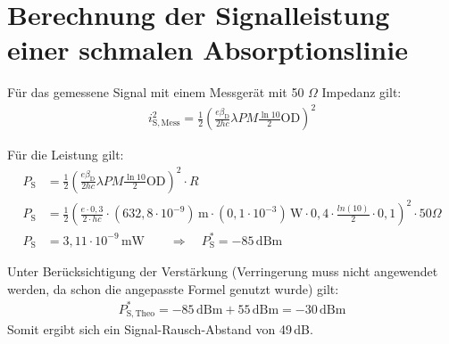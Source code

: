 
\section{Berechnung der Signalleistung einer schmalen Absorptionslinie}
\label{sec:signalAbsorp}

Für das gemessene Signal mit einem Messgerät mit 50 $\Omega$ Impedanz gilt:
\begin{gather}
    i_\mathrm{S,Mess}^2 = \frac{1}{2}\left(\frac{e\beta_\mathrm{D}}{2hc}\lambda P M \frac{\ln10}{2}\mathrm{OD}\right)^2
\end{gather}

Für die Leistung gilt:
\begin{align}
    \label{eq:leistungPhotosignal}
    P_\mathrm{S} &= \frac{1}{2}\left(\frac{e\beta_\mathrm{D}}{2hc}\lambda P M \frac{\ln10}{2}\mathrm{OD}\right)^2 \cdot R\\
    P_\mathrm{S} &= \frac{1}{2} \left( \frac{e\cdot 0,3}{2\cdot h c} \cdot (632,8 \cdot 10^{-9}) \, \mathrm{m} \cdot (0,1 \cdot 10^{-3}) \, \mathrm{W} \cdot 0,4 \cdot \frac{ln(10)}{2} \cdot 0,1\right)^2 \cdot 50 \Omega \\
    P_\mathrm{S} &= 3,11 \cdot 10^{-9}\,\mathrm{mW} \qquad \Rightarrow \quad P_\mathrm{S}^* = -85 \, \mathrm{dBm}
\end{align}

Unter Berücksichtigung der Verstärkung (Verringerung muss nicht angewendet werden, da schon die angepasste Formel genutzt wurde) gilt:
\begin{gather}
    P_\mathrm{S,Theo}^* = -85 \, \text{dBm} + 55 \, \text{dBm} = -30 \, \text{dBm}
\end{gather}
Somit ergibt sich ein Signal-Rausch-Abstand von 49\,dB.
